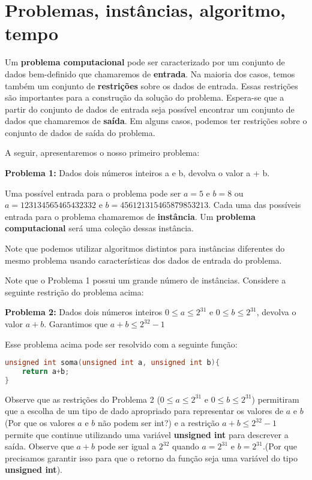 
\chapter{Problemas, instâncias, algoritmo, tempo}

Um \textbf{problema computacional} pode ser caracterizado por um conjunto de dados bem-definido que chamaremos de \textbf{entrada}. Na maioria dos casos, temos também um conjunto de \textbf{restrições} sobre os dados de entrada. Essas restrições são importantes para a construção da solução do problema. Espera-se que a partir do conjunto de dados de entrada seja possível encontrar um conjunto de dados que chamaremos de \textbf{saída}. Em alguns casos, podemos ter restrições sobre o conjunto de dados de saída do problema.

A seguir, apresentaremos o nosso primeiro problema: 

\textbf{Problema 1:} Dados dois números inteiros a e b, devolva o valor a + b.

Uma possível entrada para o problema pode ser $a = 5$ e $b = 8$ ou $a = 123134565465432332$ e $b = 456121315465879853213$. Cada uma das possíveis entrada para o problema chamaremos de \textbf{instância}. Um \textbf{problema computacional} será uma coleção dessas instância. 

Note que podemos utilizar algoritmos distintos para instâncias diferentes do mesmo problema usando características dos dados de entrada do problema.

Note que o Problema 1 possui um grande número de instâncias. Considere a seguinte restrição do problema acima:

\textbf{Problema 2:} Dados dois números inteiros $0 \leq a \leq 2^{31}$ e $ 0 \leq b \leq 2^{31}$, devolva o valor $a + b$. Garantimos que $a+b \leq 2^{32}-1$ 

Esse problema acima pode ser resolvido com a seguinte função:

\begin{lstlisting}[language=C, caption={Solução para o problema 2}]
unsigned int soma(unsigned int a, unsigned int b){
	return a+b;
}
\end{lstlisting}

Observe que as restrições do Problema 2 ($0 \leq a \leq 2^{31}$ e $ 0 \leq b \leq 2^{31}$) permitiram que a escolha de um tipo de dado apropriado para representar os valores de $a$ e $b$ (Por que os valores $a$ e $b$ não podem ser int?) e a restrição $a+b \leq 2^{32}-1$ permite que continue utilizando uma variável \textbf{unsigned int} para descrever a saída. Observe que $a + b$ pode ser igual a $2^{32}$ quando $a = 2^{31}$ e $b=2^{31}$.(Por que precisamos garantir isso para que o retorno da função seja uma variável do tipo \textbf{unsigned int}).   


